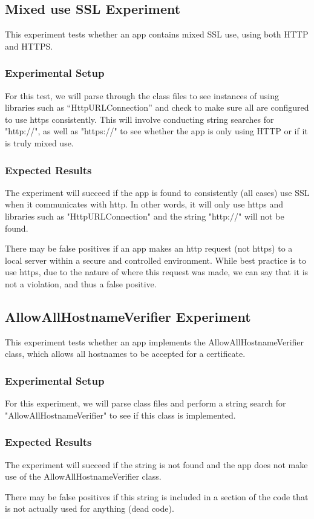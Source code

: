 \documentclass[10pt,twocolumn,pdftex]{article}
\begin{document}
\subsection{Mixed use SSL Experiment}
    This experiment tests whether an app contains mixed SSL use, using both HTTP and HTTPS. 
    
    \subsubsection{Experimental Setup}
    For this test, we will parse through the class files to see instances of using libraries such as “HttpURLConnection” and check to make sure all are configured to use https consistently. This will involve conducting string searches for "http://", as well as "https://" to see whether the app is only using HTTP or if it is truly mixed use. 
    
    \subsubsection{Expected Results}
    The experiment will succeed if the app is found to consistently (all cases) use SSL when it communicates with http. In other words, it will only use https and libraries such as "HttpURLConnection" and the string "http://" will not be found. 
    
    There may be false positives if an app makes an http request (not https) to a local server within a secure and controlled environment. While best practice is to use https, due to the nature of where this request was made, we can say that it is not a violation, and thus a false positive.
    
    
\subsection{AllowAllHostnameVerifier Experiment}
    This experiment tests whether an app implements the AllowAllHostnameVerifier class, which allows all hostnames to be accepted for a certificate.
    
    \subsubsection{Experimental Setup}
    For this experiment, we will parse class files and perform a string search for "AllowAllHostnameVerifier" to see if this class is implemented.
    
    \subsubsection{Expected Results}
    The experiment will succeed if the string is not found and the app does not make use of the AllowAllHostnameVerifier class.
    
    There may be false positives if this string is included in a section of the code that is not actually used for anything (dead code).



\end{document}
